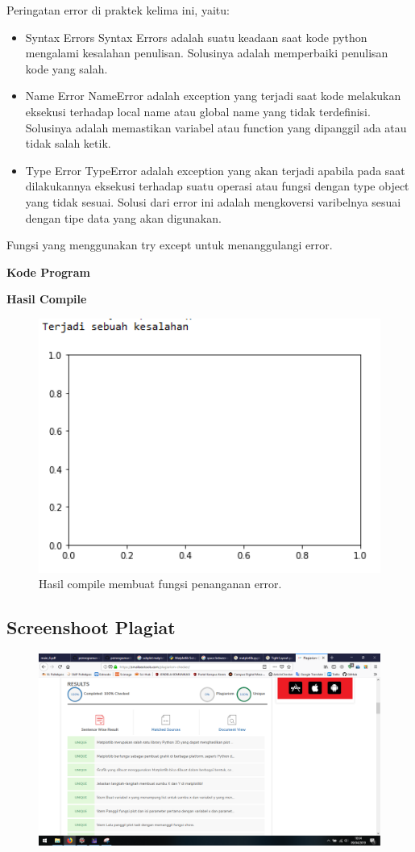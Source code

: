 \hfill \break
Peringatan error di praktek kelima ini, yaitu:
\begin{itemize}
	\item Syntax Errors
	Syntax Errors adalah suatu keadaan saat kode python mengalami kesalahan penulisan. Solusinya adalah memperbaiki penulisan kode yang salah.
	
	\item Name Error
	NameError adalah exception yang terjadi saat kode melakukan eksekusi terhadap local name atau global name yang tidak terdefinisi. Solusinya adalah memastikan variabel atau function yang dipanggil ada atau tidak salah ketik.
	
	\item Type Error
	TypeError adalah exception yang akan terjadi apabila pada saat dilakukannya eksekusi terhadap suatu operasi atau fungsi dengan type object yang tidak sesuai. Solusi dari error ini adalah mengkoversi varibelnya sesuai dengan tipe data yang akan digunakan.
\end{itemize}
\hfill \break
Fungsi yang menggunakan try except untuk menanggulangi error.

\hfill \break
\textbf{Kode Program}



\hfill \break
\textbf{Hasil Compile}

\begin{figure}[H]
	\includegraphics[width=12cm]{figures/6/1154016/praktek/error.png}
	\centering
	\caption{Hasil compile membuat fungsi penanganan error.}
\end{figure}

\subsection{Screenshoot Plagiat}
\begin{figure}[H]
	\includegraphics[width=12cm]{figures/6/1154016/praktek/plagiat.png}
	\centering
\end{figure}
